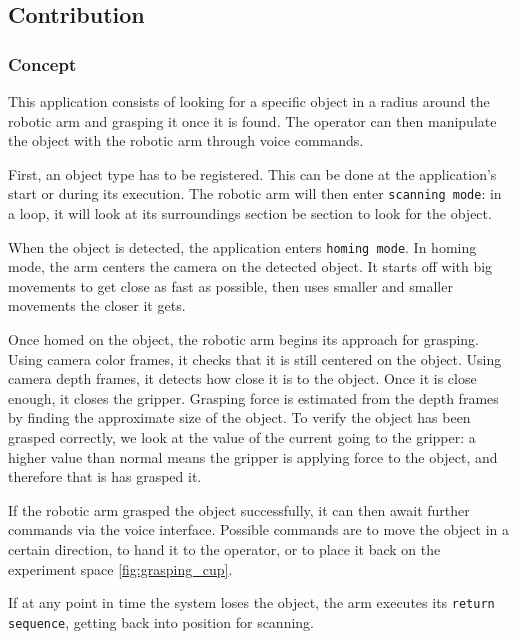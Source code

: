 


\subsection{Contribution}

\subsubsection{Concept}

This application consists of looking for a specific object in a radius around the robotic arm and grasping it once it is found. The operator can then manipulate the object with the robotic arm through voice commands.

First, an object type has to be registered. This can be done at the application's start or during its execution. The robotic arm will then enter \lstinline{scanning mode}: in a loop, it will look at its surroundings section be section to look for the object.

When the object is detected, the application enters \lstinline{homing mode}. In homing mode, the arm centers the camera on the detected object. It starts off with big movements to get close as fast as possible, then uses smaller and smaller movements the closer it gets.

Once homed on the object, the robotic arm begins its approach for grasping. Using camera color frames, it checks that it is still centered on the object. Using camera depth frames, it detects how close it is to the object. Once it is close enough, it closes the gripper. Grasping force is estimated from the depth frames by finding the approximate size of the object. To verify the object has been grasped correctly, we look at the value of the current going to the gripper: a higher value than normal means the gripper is applying force to the object, and therefore that is has grasped it.

If the robotic arm grasped the object successfully, it can then await further commands via the voice interface. Possible commands are to move the object in a certain direction, to hand it to the operator, or to place it back on the experiment space \ref{fig:grasping_cup}.

If at any point in time the system loses the object, the arm executes its \lstinline{return sequence}, getting back into position for scanning.

